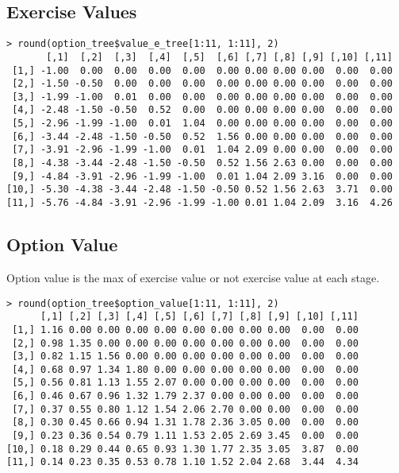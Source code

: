 \documentclass[11pt]{scrartcl}
\begin{document}
\begin{landscape}
\newpage

\subsection{Exercise Values}

\begin{lstlisting}
> round(option_tree$value_e_tree[1:11, 1:11], 2)
       [,1]  [,2]  [,3]  [,4]  [,5]  [,6] [,7] [,8] [,9] [,10] [,11]
 [1,] -1.00  0.00  0.00  0.00  0.00  0.00 0.00 0.00 0.00  0.00  0.00
 [2,] -1.50 -0.50  0.00  0.00  0.00  0.00 0.00 0.00 0.00  0.00  0.00
 [3,] -1.99 -1.00  0.01  0.00  0.00  0.00 0.00 0.00 0.00  0.00  0.00
 [4,] -2.48 -1.50 -0.50  0.52  0.00  0.00 0.00 0.00 0.00  0.00  0.00
 [5,] -2.96 -1.99 -1.00  0.01  1.04  0.00 0.00 0.00 0.00  0.00  0.00
 [6,] -3.44 -2.48 -1.50 -0.50  0.52  1.56 0.00 0.00 0.00  0.00  0.00
 [7,] -3.91 -2.96 -1.99 -1.00  0.01  1.04 2.09 0.00 0.00  0.00  0.00
 [8,] -4.38 -3.44 -2.48 -1.50 -0.50  0.52 1.56 2.63 0.00  0.00  0.00
 [9,] -4.84 -3.91 -2.96 -1.99 -1.00  0.01 1.04 2.09 3.16  0.00  0.00
[10,] -5.30 -4.38 -3.44 -2.48 -1.50 -0.50 0.52 1.56 2.63  3.71  0.00
[11,] -5.76 -4.84 -3.91 -2.96 -1.99 -1.00 0.01 1.04 2.09  3.16  4.26
\end{lstlisting}

\subsection{Option Value}

Option value is the max of exercise value or not exercise value at each stage.

\begin{lstlisting}
> round(option_tree$option_value[1:11, 1:11], 2)
      [,1] [,2] [,3] [,4] [,5] [,6] [,7] [,8] [,9] [,10] [,11]
 [1,] 1.16 0.00 0.00 0.00 0.00 0.00 0.00 0.00 0.00  0.00  0.00
 [2,] 0.98 1.35 0.00 0.00 0.00 0.00 0.00 0.00 0.00  0.00  0.00
 [3,] 0.82 1.15 1.56 0.00 0.00 0.00 0.00 0.00 0.00  0.00  0.00
 [4,] 0.68 0.97 1.34 1.80 0.00 0.00 0.00 0.00 0.00  0.00  0.00
 [5,] 0.56 0.81 1.13 1.55 2.07 0.00 0.00 0.00 0.00  0.00  0.00
 [6,] 0.46 0.67 0.96 1.32 1.79 2.37 0.00 0.00 0.00  0.00  0.00
 [7,] 0.37 0.55 0.80 1.12 1.54 2.06 2.70 0.00 0.00  0.00  0.00
 [8,] 0.30 0.45 0.66 0.94 1.31 1.78 2.36 3.05 0.00  0.00  0.00
 [9,] 0.23 0.36 0.54 0.79 1.11 1.53 2.05 2.69 3.45  0.00  0.00
[10,] 0.18 0.29 0.44 0.65 0.93 1.30 1.77 2.35 3.05  3.87  0.00
[11,] 0.14 0.23 0.35 0.53 0.78 1.10 1.52 2.04 2.68  3.44  4.34
\end{lstlisting}

\end{landscape}
\end{document}
